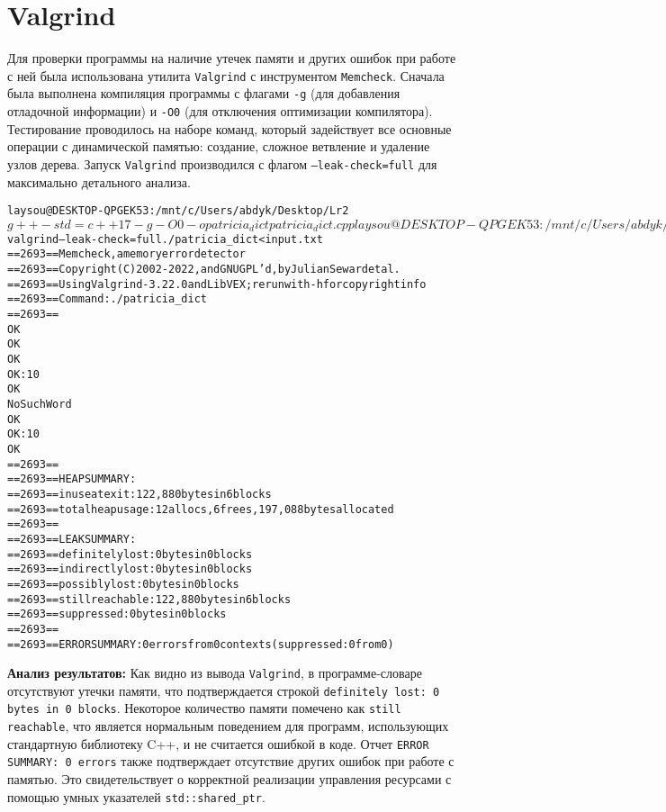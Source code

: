 \pagebreak

\section{Valgrind}
Для проверки программы на наличие утечек памяти и других ошибок при работе с ней была использована утилита \texttt{Valgrind} с инструментом \texttt{Memcheck}. Сначала была выполнена компиляция программы с флагами \texttt{-g} (для добавления отладочной информации) и \texttt{-O0} (для отключения оптимизации компилятора). Тестирование проводилось на наборе команд, который задействует все основные операции с динамической памятью: создание, сложное ветвление и удаление узлов дерева. Запуск \texttt{Valgrind} производился с флагом \texttt{--leak-check=full} для максимально детального анализа.

\begin{alltt}
\selectfont
laysou@DESKTOP-QPGEK53:/mnt/c/Users/abdyk/Desktop/Lr2$ g++ -std=c++17 -g -O0 -o patricia_dict patricia_dict.cpp
laysou@DESKTOP-QPGEK53:/mnt/c/Users/abdyk/Desktop/Lr2$ valgrind --leak-check=full ./patricia_dict < input.txt
==2693== Memcheck, a memory error detector
==2693== Copyright (C) 2002-2022, and GNU GPL'd, by Julian Seward et al.
==2693== Using Valgrind-3.22.0 and LibVEX; rerun with -h for copyright info
==2693== Command: ./patricia_dict
==2693==
OK
OK
OK
OK: 10
OK
NoSuchWord
OK
OK: 10
OK
==2693==
==2693== HEAP SUMMARY:
==2693==     in use at exit: 122,880 bytes in 6 blocks
==2693==   total heap usage: 12 allocs, 6 frees, 197,088 bytes allocated
==2693==
==2693== LEAK SUMMARY:
==2693==    definitely lost: 0 bytes in 0 blocks
==2693==    indirectly lost: 0 bytes in 0 blocks
==2693==      possibly lost: 0 bytes in 0 blocks
==2693==    still reachable: 122,880 bytes in 6 blocks
==2693==         suppressed: 0 bytes in 0 blocks
==2693==
==2693== ERROR SUMMARY: 0 errors from 0 contexts (suppressed: 0 from 0)
\end{alltt}

\textbf{Анализ результатов:} Как видно из вывода \texttt{Valgrind}, в программе-словаре отсутствуют утечки памяти, что подтверждается строкой \texttt{definitely lost: 0 bytes in 0 blocks}. Некоторое количество памяти помечено как \texttt{still reachable}, что является нормальным поведением для программ, использующих стандартную библиотеку C++, и не считается ошибкой в коде. Отчет \texttt{ERROR SUMMARY: 0 errors} также подтверждает отсутствие других ошибок при работе с памятью. Это свидетельствует о корректной реализации управления ресурсами с помощью умных указателей \texttt{std::shared\_ptr}.
\pagebreak

